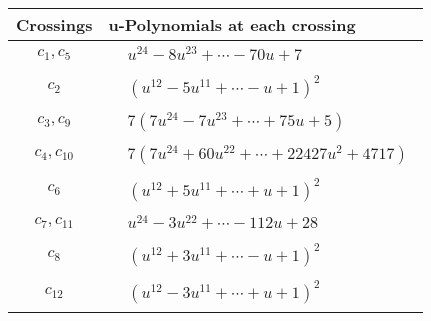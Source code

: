 \documentclass[1p]{elsarticle_modified}
\theoremstyle{definition}
\begin{document}
\begin{tabular}{m{50pt}|m{274pt}}
Crossings & \hspace{64pt}u-Polynomials at each crossing \\
\hline $$\begin{aligned}c_{1},c_{5}\end{aligned}$$&$\begin{aligned}
&u^{24}-8 u^{23}+\cdots-70 u+7
\end{aligned}$\\
\hline $$\begin{aligned}c_{2}\end{aligned}$$&$\begin{aligned}
&(u^{12}-5 u^{11}+\cdots- u+1)^{2}
\end{aligned}$\\
\hline $$\begin{aligned}c_{3},c_{9}\end{aligned}$$&$\begin{aligned}
&7(7 u^{24}-7 u^{23}+\cdots+75 u+5)
\end{aligned}$\\
\hline $$\begin{aligned}c_{4},c_{10}\end{aligned}$$&$\begin{aligned}
&7(7 u^{24}+60 u^{22}+\cdots+22427 u^2+4717)
\end{aligned}$\\
\hline $$\begin{aligned}c_{6}\end{aligned}$$&$\begin{aligned}
&(u^{12}+5 u^{11}+\cdots+u+1)^{2}
\end{aligned}$\\
\hline $$\begin{aligned}c_{7},c_{11}\end{aligned}$$&$\begin{aligned}
&u^{24}-3 u^{22}+\cdots-112 u+28
\end{aligned}$\\
\hline $$\begin{aligned}c_{8}\end{aligned}$$&$\begin{aligned}
&(u^{12}+3 u^{11}+\cdots- u+1)^{2}
\end{aligned}$\\
\hline $$\begin{aligned}c_{12}\end{aligned}$$&$\begin{aligned}
&(u^{12}-3 u^{11}+\cdots+u+1)^{2}
\end{aligned}$\\
\hline
\end{tabular}\\~\\
\end{document}
